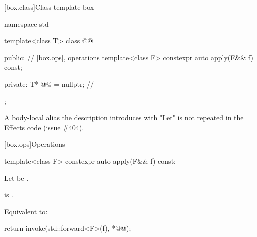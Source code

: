 [box.class]{Class template box}

\begin{codeblock}
namespace std {
  template<class T>
  class @@ {
  public:
    // \ref{box.ops}, operations
    template<class F> constexpr auto apply(F&& f) const;

  private:
    T* @@ = nullptr; // \expos
  };
}
\end{codeblock}

\pnum
A body-local alias the description introduces with "Let" is not repeated in the Effects code (issue \#404).

[box.ops]{Operations}

%
\begin{itemdecl}
template<class F>
  constexpr auto apply(F&& f) const;
\end{itemdecl}

\begin{itemdescr}
\pnum
Let  be .

\pnum
\mandates
{} is .

\pnum
\effects
Equivalent to:
\begin{codeblock}
return invoke(std::forward<F>(f), *@@);
\end{codeblock}
\end{itemdescr}
